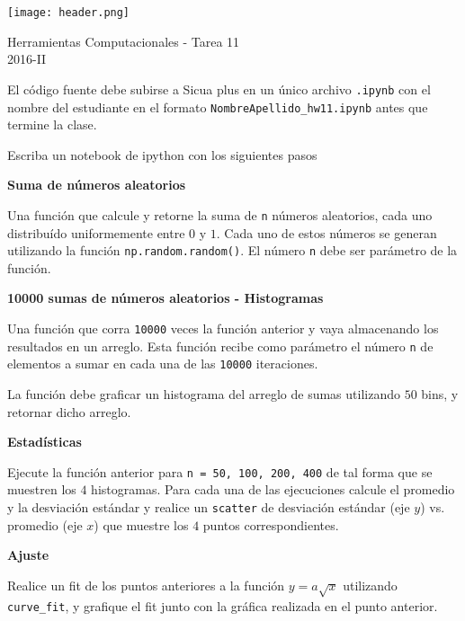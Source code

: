 \documentclass[11pt,letterpaper]{exam}
\begin{document}
\begin{center}

\texttt{[image: header.png]}

\vspace{1.0cm}
{\Large Herramientas Computacionales - Tarea 11}\\
2016-II
\end{center}



\vspace{0.5cm}

\noindent
El c\'odigo fuente debe subirse a Sicua plus en un \'unico archivo
\verb".ipynb" con el nombre del estudiante en el formato \verb"NombreApellido_hw11.ipynb" antes que termine la clase.

\vspace{0.5cm}

Escriba un notebook de ipython con los siguientes pasos

\begin{questions}

\question[0.5]\textbf{Suma de n\'umeros aleatorios}

Una funci\'on que calcule y retorne la suma de \verb'n' n\'umeros aleatorios, cada uno distribu\'ido uniformemente entre $0$ y $1$. Cada uno de estos n\'umeros se generan utilizando la funci\'on \verb'np.random.random()'. El n\'umero \verb'n' debe ser par\'ametro de la funci\'on.

\question[2.0]\textbf{10000 sumas de n\'umeros aleatorios - Histogramas}

Una funci\'on que corra \verb'10000' veces la funci\'on anterior y vaya almacenando los resultados en un arreglo. Esta funci\'on recibe como par\'ametro el n\'umero \verb'n' de elementos a sumar en cada una de las \verb'10000' iteraciones.

La funci\'on debe graficar un histograma del arreglo de sumas utilizando $50$ bins, y retornar dicho arreglo. 

\question[1.5]\textbf{Estad\'isticas}

Ejecute la funci\'on anterior para \verb'n = 50, 100, 200, 400' de tal forma que se muestren los $4$ histogramas. Para cada una de las ejecuciones calcule el promedio y la desviaci\'on est\'andar y realice un \verb'scatter' de desviaci\'on est\'andar (eje $y$) vs. promedio (eje $x$) que muestre los $4$ puntos correspondientes.

\question[1.0]\textbf{Ajuste}

Realice un fit de los puntos anteriores a la función $y = a\sqrt{x}$ utilizando \verb'curve_fit',  y grafique el fit junto con la gr\'afica realizada en el punto anterior.

\end{questions}
\end{document}
